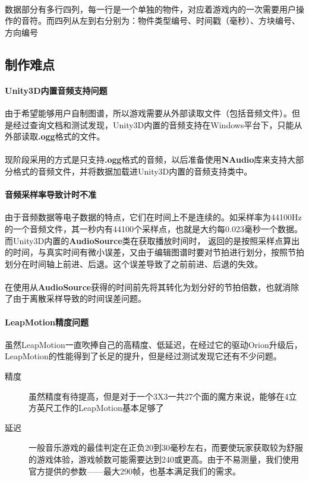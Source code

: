 \documentclass{article}
\begin{document}
\paragraph{}
数据部分有多行四列，每一行是一个单独的物件，对应着游戏内的一次需要用户操作的音符。而四列从左到右分别为：物件类型编号、时间戳（毫秒）、方块编号、方向编号
\subsection{制作难点}
\paragraph{Unity3D内置音频支持问题}
由于希望能够用户自制图谱，所以游戏需要从外部读取文件（包括音频文件）。但是经过查询文档和测试发现，Unity3D内置的音频支持在Windows平台下，只能从外部读取\textbf{.ogg}格式的文件。
\paragraph{}
现阶段采用的方式是只支持\textbf{.ogg}格式的音频，以后准备使用\textbf{NAudio}库来支持大部分格式的音频文件，并将数据加载进Unity3D内置的音频支持类中。
\paragraph{音频采样率导致计时不准}
由于音频数据等电子数据的特点，它们在时间上不是连续的。如采样率为44100Hz的一个音频文件，其一秒内有44100个采样点，也就是大约每0.023毫秒一个数据。而Unity3D内置的\textbf{AudioSource}类在获取播放时间时，
返回的是按照采样点算出的时间，与真实时间有微小误差，又由于编辑图谱时要对节拍进行划分，按照节拍划分在时间轴上前进、后退。这个误差导致了之前前进、后退的失效。
\paragraph{}
在使用从\textbf{AudioSource}获得的时间前先将其转化为划分好的节拍倍数，也就消除了由于离散采样导致的时间误差问题。
\paragraph{LeapMotion精度问题}
虽然LeapMotion一直吹捧自己的高精度、低延迟，在经过它的驱动Orion升级后，LeapMotion的性能得到了长足的提升，但是经过测试发现它还有不少问题。
\begin{description}
  \item[精度] 虽然精度有待提高，但是对于一个3X3一共27个面的魔方来说，能够在4立方英尺工作的LeapMotion基本足够了
  \item[延迟] 一般音乐游戏的最佳判定在正负20到30毫秒左右，而要使玩家获取较为舒服的游戏体验，游戏帧数可能需要达到240或更高。由于不易测量，我们使用官方提供的参数——最大290帧，也基本满足我们的需求。
\end{description}
\end{document}
